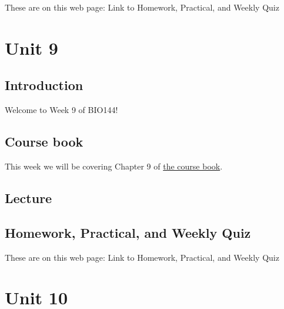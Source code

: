 \documentclass[
  letterpaper,
  8pt,
  a4paper]{book}
\begin{document}

These are on this web page: Link to Homework, Practical, and Weekly Quiz


\chapter*{Unit 9}\label{unit-9}


\section*{Introduction}\label{introduction-9}


Welcome to Week 9 of BIO144!

\section*{Course book}\label{course-book-8}


This week we will be covering Chapter 9 of
\href{https://opetchey.github.io/BIO144_Course_Book/}{the course book}.

\section*{Lecture}\label{lecture-8}


\section*{Homework, Practical, and Weekly
Quiz}\label{homework-practical-and-weekly-quiz-8}


These are on this web page: Link to Homework, Practical, and Weekly Quiz


\chapter*{Unit 10}\label{unit-10}
\end{document}

